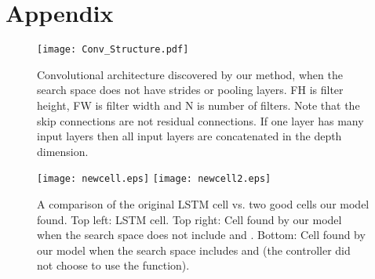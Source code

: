 \documentclass{article} \usepackage{iclr2017_conference,times}
\begin{document}



\newpage
\appendix
\section{Appendix}
\label{sec:appendix}

\begin{figure}[h!]
\begin{center}
\centerline{\texttt{[image: Conv\_Structure.pdf]}}
\caption{Convolutional architecture discovered by our method, when the
  search space does not have strides or pooling layers. FH is filter
  height, FW is filter width and N is number of filters. Note that the
  skip connections are not residual connections. If one layer has many
  input layers then all input layers are concatenated in the depth
  dimension.}
\label{figure:strange_net}
\end{center}
\end{figure} 


\begin{figure}
\begin{center}
  \texttt{[image: newcell.eps]}
  \texttt{[image: newcell2.eps]}
\caption{A comparison of the original LSTM cell vs. two good cells our
  model found. Top left: LSTM cell. Top right: Cell found by our model
  when the search space does not include  and . Bottom: Cell
  found by our model when the search space includes  and 
  (the controller did not choose to use the  function).}
\label{fig:strange_cell}
\end{center}
\end{figure}
\end{document}

